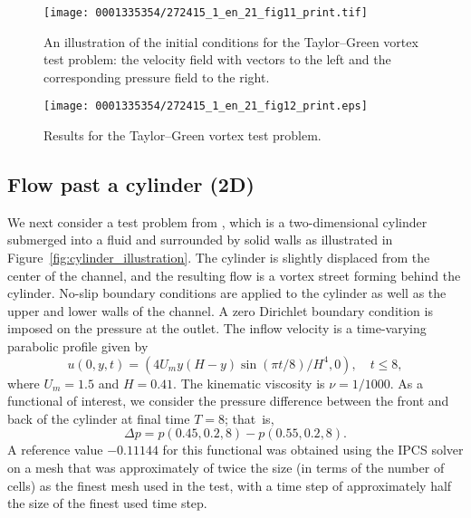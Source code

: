 \begin{figure}[!t]
\centering
\texttt{[image: 0001335354/272415\_1\_en\_21\_fig11\_print.tif]}
    \caption{An illustration of the initial conditions for the
      Taylor--Green vortex test problem: the velocity field with
      vectors to the left and the corresponding pressure field to the
      right.}
    \label{fig:periodic}%
\end{figure}

\makeatletter
\def\img@cmode{\hskip-5pt\begin{turn}{90}\rlap{\kern30\p@\@img@cmode{\@cmodetext}}\end{turn}}
\makeatother

\begin{figure}[!t]
\centering
\texttt{[image: 0001335354/272415\_1\_en\_21\_fig12\_print.eps]}
\caption{Results for the Taylor--Green vortex test problem.}
\label{fig:periodic_res}\vspace*{9pt}
\end{figure}

\makeatletter
\def\img@cmode{\hskip-5pt\begin{turn}{90}\rlap{\kern1.5\p@\@img@cmode{\@cmodetext}}\end{turn}}
\makeatother

\subsection{Flow past a cylinder (2D)}

We next consider a test problem from \citet{Turek1996}, which is a
two-dimensional cylinder submerged into a fluid and surrounded by
solid walls as illustrated in
Figure~\ref{fig:cylinder_illustration}. The cylinder is slightly
displaced from the center of the channel, and the resulting flow is a
vortex street forming behind the cylinder. No-slip boundary conditions
are applied to the cylinder as well as the upper and lower walls of
the channel. A zero Dirichlet boundary condition is imposed on the
pressure at the outlet. The inflow velocity is a time-varying
parabolic profile given by
\begin{equation} \label{eq:cyl_inflow}
  u(0, y, t) = (4 U_m y (H - y) \sin(\pi t/8)/H^{4}, 0), \quad t \leqslant 8,
\end{equation}
where $U_m = 1.5$ and $H = 0.41$. The kinematic viscosity is $\nu =
1/1000$. As a functional of interest, we consider the pressure
difference between the front and back of the cylinder at final time $T
= 8$; that~is,
\begin{equation}\label{eq:dp}
\Delta p = p(0.45, 0.2, 8) - p(0.55, 0.2, 8).
\end{equation}
A reference value $-0.11144$ for this functional was obtained using
the IPCS solver on a mesh that was approximately of twice the size (in
terms of the number of cells) as the finest mesh used in the test,
with a time step of approximately half the size of the finest used
time step.


